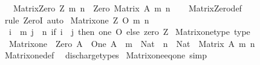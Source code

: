 \begin{isabellebody}
\ \ \ {\isachardoublequoteopen}Matrix{\isacharunderscore}{\kern0pt}Zero\ Z\ m\ n\ {\isacharcolon}{\kern0pt}\ Zero\ {\isacharparenleft}{\kern0pt}Matrix\ A\ m\ n{\isacharparenright}{\kern0pt}{\isachardoublequoteclose}\isanewline
%
\isadelimproof
\ \ %
\endisadelimproof
%
\isatagproof
{}\isamarkupfalse%
\ Matrix{\isacharunderscore}{\kern0pt}Zero{\isacharunderscore}{\kern0pt}def\ \isamarkupfalse%
\ {\isacharparenleft}{\kern0pt}rule\ ZeroI{\isacharparenright}{\kern0pt}\ auto%
\endisatagproof
{\isafoldproof}%
%
\isadelimproof
%
\endisadelimproof
%
\isadelimdocument
%
\endisadelimdocument
%
\isatagdocument
%
\isamarkuptrue%
%
\endisatagdocument
{\isafolddocument}%
%
\isadelimdocument
%
\endisadelimdocument
{}\isamarkupfalse%
\ {\isachardoublequoteopen}Matrix{\isacharunderscore}{\kern0pt}one\ Z\ O\ m\ n\ {\isasymequiv}\isanewline
\ \ {\isasymlambda}i\ {\isasymin}\ {\isacharbrackleft}{\kern0pt}{}{\isacharcomma}{\kern0pt}{\isasymdots}{\isacharcomma}{\kern0pt}m{\isacharbrackleft}{\kern0pt}{\isachardot}{\kern0pt}\ {\isasymlambda}j\ {\isasymin}\ {\isacharbrackleft}{\kern0pt}{}{\isacharcomma}{\kern0pt}{\isasymdots}{\isacharcomma}{\kern0pt}n{\isacharbrackleft}{\kern0pt}{\isachardot}{\kern0pt}\ if\ i\ {\isacharequal}{\kern0pt}\ j\ then\ one\ O\ else\ zero\ Z{\isachardoublequoteclose}\isanewline
\isanewline
{}\isamarkupfalse%
\ Matrix{\isacharunderscore}{\kern0pt}one{\isacharunderscore}{\kern0pt}type\ {\isacharbrackleft}{\kern0pt}type{\isacharbrackright}{\kern0pt}{\isacharcolon}{\kern0pt}\isanewline
\ \ {\isachardoublequoteopen}Matrix{\isacharunderscore}{\kern0pt}one\ {\isacharcolon}{\kern0pt}\ Zero\ A\ {\isasymRightarrow}\ One\ A\ {\isasymRightarrow}\ {\isacharparenleft}{\kern0pt}m\ {\isacharcolon}{\kern0pt}\ Nat{\isacharparenright}{\kern0pt}\ {\isasymRightarrow}\ {\isacharparenleft}{\kern0pt}n\ {\isacharcolon}{\kern0pt}\ Nat{\isacharparenright}{\kern0pt}\ {\isasymRightarrow}\ Matrix\ A\ m\ n{\isachardoublequoteclose}\isanewline
%
\isadelimproof
\ \ %
\endisadelimproof
%
\isatagproof
{}\isamarkupfalse%
\ Matrix{\isacharunderscore}{\kern0pt}one{\isacharunderscore}{\kern0pt}def\ \isamarkupfalse%
\ discharge{\isacharunderscore}{\kern0pt}types%
\endisatagproof
{\isafoldproof}%
%
\isadelimproof
\isanewline
%
\endisadelimproof
\isanewline
{}\isamarkupfalse%
\ Matrix{\isacharunderscore}{\kern0pt}one{\isacharunderscore}{\kern0pt}eq{\isacharunderscore}{\kern0pt}one\ {\isacharbrackleft}{\kern0pt}simp{\isacharbrackright}{\kern0pt}{\isacharcolon}{\kern0pt}\isanewline

\end{isabellebody}
